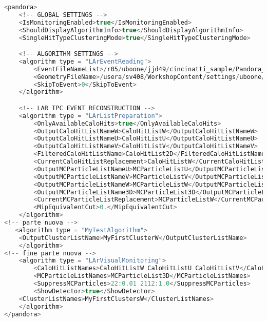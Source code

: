 \begin{lstlisting}[language=C++, label=code:first_cluster.xml, caption=PandoraSettings_Workshop.xml]
<pandora>
    <!-- GLOBAL SETTINGS -->
    <IsMonitoringEnabled>true</IsMonitoringEnabled>
    <ShouldDisplayAlgorithmInfo>true</ShouldDisplayAlgorithmInfo>
    <SingleHitTypeClusteringMode>true</SingleHitTypeClusteringMode>

    <!-- ALGORITHM SETTINGS -->
    <algorithm type = "LArEventReading">
        <EventFileNameList>/r05/uboone/jjd49/cincinatti_sample/Pandora_Events_Cincinatti_BNB_NuMu_1714.pndr</EventFileNameList>
        <GeometryFileName>/usera/sv408/WorkshopContent/settings/uboone/Geometry_MicroBooNE.xml</GeometryFileName>
        <SkipToEvent>0</SkipToEvent>
    </algorithm>

    <!-- LAR TPC EVENT RECONSTRUCTION -->
    <algorithm type = "LArListPreparation">
        <OnlyAvailableCaloHits>true</OnlyAvailableCaloHits>
        <OutputCaloHitListNameW>CaloHitListW</OutputCaloHitListNameW>
        <OutputCaloHitListNameU>CaloHitListU</OutputCaloHitListNameU>
        <OutputCaloHitListNameV>CaloHitListV</OutputCaloHitListNameV>
        <FilteredCaloHitListName>CaloHitList2D</FilteredCaloHitListName>
        <CurrentCaloHitListReplacement>CaloHitListW</CurrentCaloHitListReplacement>
        <OutputMCParticleListNameU>MCParticleListU</OutputMCParticleListNameU>
        <OutputMCParticleListNameV>MCParticleListV</OutputMCParticleListNameV>
        <OutputMCParticleListNameW>MCParticleListW</OutputMCParticleListNameW>
        <OutputMCParticleListName3D>MCParticleList3D</OutputMCParticleListName3D>
        <CurrentMCParticleListReplacement>MCParticleListW</CurrentMCParticleListReplacement>
        <MipEquivalentCut>0.</MipEquivalentCut>
    </algorithm>
<!-- parte nuova -->
   <algorithm type = "MyTestAlgorithm">
	<OutputClusterListName>MyFirstClusterW</OutputClusterListName>
    </algorithm>
<!-- fine parte nuova -->
    <algorithm type = "LArVisualMonitoring">
        <CaloHitListNames>CaloHitListW CaloHitListU CaloHitListV</CaloHitListNames>
        <MCParticleListNames>MCParticleList3D</MCParticleListNames>
        <SuppressMCParticles>22:0.01 2112:1.0</SuppressMCParticles>
        <ShowDetector>true</ShowDetector>
	<ClusterListNames>MyFirstClustersW</ClusterListNames>
    </algorithm>
</pandora>
\end{lstlisting}

